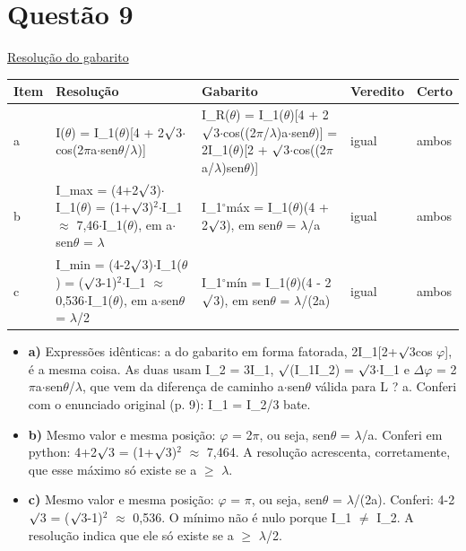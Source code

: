 \documentclass{article}%
\begin{document}
\section*{Questão 9}%
\href{https://poliedroresolve.sistemapoliedro.com.br/vestibulares/ime/2026/ime-2-fase-dia-2-24-10-2025-2-fase-dia-2/dissertativa-9-fisica-2-fase-dia-2-ime-2026}{Resolução do gabarito}\par\smallskip%
\begin{longtable}{@{}p{} p{} p{} p{} p{}@{}}\toprule Item & Resolução & Gabarito & Veredito & Certo \\ \midrule
a & I($\theta$) = I\_1($\theta$){[}4 + 2$\surd$3$\cdot$cos(2$\pi$a$\cdot$sen$\theta$/$\lambda$){]} & I\_R($\theta$) = I\_1($\theta$){[}4 + 2$\surd$3$\cdot$cos((2$\pi$/$\lambda$)a$\cdot$sen$\theta$){]} = 2I\_1($\theta$){[}2 + $\surd$3$\cdot$cos((2$\pi$a/$\lambda$)sen$\theta$){]} & igual & ambos \\
b & I\_max = (4+2$\surd$3)$\cdot$I\_1($\theta$) = (1+$\surd$3)$^2$$\cdot$I\_1 $\approx$ 7,46$\cdot$I\_1($\theta$), em a$\cdot$sen$\theta$ = $\lambda$ & I\_1$^\circ$máx = I\_1($\theta$)(4 + 2$\surd$3), em sen$\theta$ = $\lambda$/a & igual & ambos \\
c & I\_min = (4-2$\surd$3)$\cdot$I\_1($\theta$) = ($\surd$3-1)$^2$$\cdot$I\_1 $\approx$ 0,536$\cdot$I\_1($\theta$), em a$\cdot$sen$\theta$ = $\lambda$/2 & I\_1$^\circ$mín = I\_1($\theta$)(4 - 2$\surd$3), em sen$\theta$ = $\lambda$/(2a) & igual & ambos \\
\bottomrule\end{longtable}%
\begin{itemize}%
\item%
\textbf{a)} Expressões idênticas: a do gabarito em forma fatorada, 2I\_1{[}2+$\surd$3cos $\varphi${]}, é a mesma coisa. As duas usam I\_2 = 3I\_1, $\surd$(I\_1I\_2) = $\surd$3$\cdot$I\_1 e $\Delta$$\varphi$ = 2$\pi$a$\cdot$sen$\theta$/$\lambda$, que vem da diferença de caminho a$\cdot$sen$\theta$ válida para L ? a. Conferi com o enunciado original (p. 9): I\_1 = I\_2/3 bate.%
\item%
\textbf{b)} Mesmo valor e mesma posição: $\varphi$ = 2$\pi$, ou seja, sen$\theta$ = $\lambda$/a. Conferi em python: 4+2$\surd$3 = (1+$\surd$3)$^2$ $\approx$ 7,464. A resolução acrescenta, corretamente, que esse máximo só existe se a $\geq$ $\lambda$.%
\item%
\textbf{c)} Mesmo valor e mesma posição: $\varphi$ = $\pi$, ou seja, sen$\theta$ = $\lambda$/(2a). Conferi: 4-2$\surd$3 = ($\surd$3-1)$^2$ $\approx$ 0,536. O mínimo não é nulo porque I\_1 $\neq$ I\_2. A resolução indica que ele só existe se a $\geq$ $\lambda$/2.%
\end{itemize}%
\end{document}
